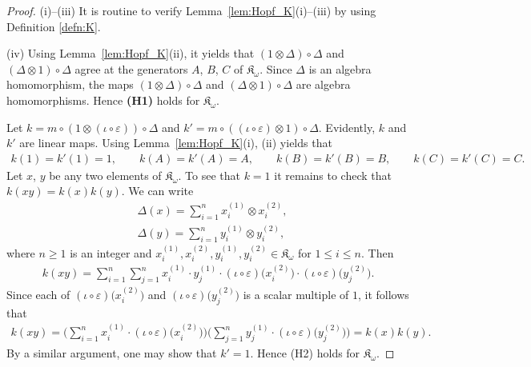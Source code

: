 \documentclass[10pt,a4paper]{amsart}
\def\K{\mathfrak K_\omega}
\def\e{\varepsilon}
\numberwithin{equation}{section}
\begin{document}
\begin{proof}
(i)--(iii) It is routine to verify Lemma~\ref{lem:Hopf_K}(i)--(iii) by using Definition \ref{defn:K}.

(iv) Using Lemma~\ref{lem:Hopf_K}(ii), it yields that $(1\otimes \Delta)\circ \Delta$ and $(\Delta\otimes 1)\circ \Delta$ agree at the generators $A$, $B$, $C$ of $\K$. Since $\Delta$ is an algebra homomorphism, the maps $(1\otimes \Delta)\circ \Delta$ and $(\Delta\otimes 1)\circ \Delta$ are algebra homomorphisms. Hence {\bf (H1)} holds for $\K$.

Let $k=m\circ (1\otimes (\iota\circ \e))\circ \Delta$ and $k'=m\circ ((\iota\circ \e)\otimes 1)\circ \Delta$. Evidently, $k$ and $k'$ are linear maps.
Using Lemma~\ref{lem:Hopf_K}(i), (ii) yields that
\begin{gather*}
k(1)=k'(1)=1,
\qquad
k(A)=k'(A)=A,
\qquad
k(B)=k'(B)=B,
\qquad
k(C)=k'(C)=C.
\end{gather*}
Let $x$, $y$ be any two elements of $\K$.
To see that $k=1$ it remains to check that $k(xy)=k(x)k(y)$. We can write
\begin{align}
&\Delta(x)=\sum_{i=1}^n x_i^{(1)}\otimes x_i^{(2)},
\label{Dx}
\\
&\Delta(y)=\sum_{i=1}^n y_i^{(1)}\otimes y_i^{(2)},
\label{Dy}
\end{align}
where $n\geq 1$ is an integer and $x_i^{(1)},x_i^{(2)},y_i^{(1)},y_i^{(2)}\in \K$ for $1\leq i\leq n$. Then
\begin{gather*}
k(xy)=
\sum_{i=1}^n \sum_{j=1}^n x_i^{(1)}\cdot y_j^{(1)}\cdot (\iota\circ \e)\big(x_i^{(2)}\big)\cdot (\iota\circ \e)\big(y_j^{(2)}\big).
\end{gather*}
Since each of $(\iota\circ \e)\big(x_i^{(2)}\big)$ and $(\iota\circ \e)\big(y_j^{(2)}\big)$ is a scalar multiple of $1$, it follows that
\begin{gather*}
k(xy)=\bigg(\sum_{i=1}^n x_i^{(1)}\cdot (\iota\circ \e)\big(x_i^{(2)}\big)\bigg)
\bigg(\sum_{j=1}^n y_j^{(1)}\cdot (\iota\circ \e)\big(y_j^{(2)}\big)\bigg)=k(x)k(y).
\end{gather*}
By a similar argument, one may show that $k'=1$. Hence (H2) holds for $\K$.


\end{proof}
\end{document}
